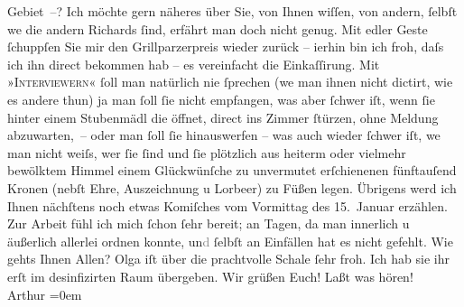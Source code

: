 \begin{ledgroupsized}[t]{13cm}
               Gebiet –? Ich möchte gern näheres über Sie, von Ihnen wiſſen, von andern, ſelbſt we{\geminationn} die andern Richards ſind, erfährt man doch nicht genug.\pend
           \pstart
           Mit edler Geste ſchuppſen Sie mir den Grillparzerpreis wieder zurück – i{\geminationm}erhin bin
               ich froh, daſs ich ihn direct bekommen hab – es vereinfacht die Einkaſſirung. Mit
                  »\textsc{Interviewern}« ſoll man natürlich nie ſprechen (we{\geminationn} man ihnen
               nicht dictirt, wie es andere thun) {\pb}ja man ſoll ſie nicht
               empfangen, was aber ſchwer iſt, wenn ſie hinter einem Stubenmädl die öffnet, direct
               ins Zimmer ſtürzen, ohne Meldung abzuwarten, – oder man ſoll ſie hinauswerfen – was
               auch wieder ſchwer iſt, we{\geminationn} man nicht weiſs, wer ſie
               ſind und ſie plötzlich aus heiterm oder vielmehr bewölktem Himmel einem Glückwünſche
               zu unvermutet erſchienenen fünftauſend Kronen (nebſt Ehre, Auszeichnung u Lorbeer) zu
               Füßen legen. Übrigens werd ich Ihnen {\pb}nächſtens noch
               etwas Komiſches vom Vormittag des 15. Januar erzählen.\pend
           \pstart
           Zur Arbeit fühl ich mich ſchon ſehr bereit; an Tagen, da man innerlich u äußerlich
               allerlei ordnen konnte, un\textcolor{gray}{d} ſelbſt an Einfällen hat es  nicht gefehlt.\pend
           \pstart
           Wie gehts Ihnen Allen? Olga iſt über die
               prachtvolle Schale ſehr froh. Ich hab sie \introOben{}ihr\introOben{} erſt im
               desinfizirten Raum übergeben.\pend
           \pstart
           Wir grüßen Euch! Laßt was hören!{\\[\baselineskip]}\spacefill\mbox{Arthur}\pend
           \leftskip=0em{}
         
         \endnumbering{}\end{ledgroupsized}  \newcommand{\dateiname}{L01758}\newcommand{\titel}{Arthur Schnitzler an Hugo von Hofmannsthal, 25. 1. 1908}\newcommand{\editorInnen}{Martin Anton Müller und Gerd-Hermann Susen}
      